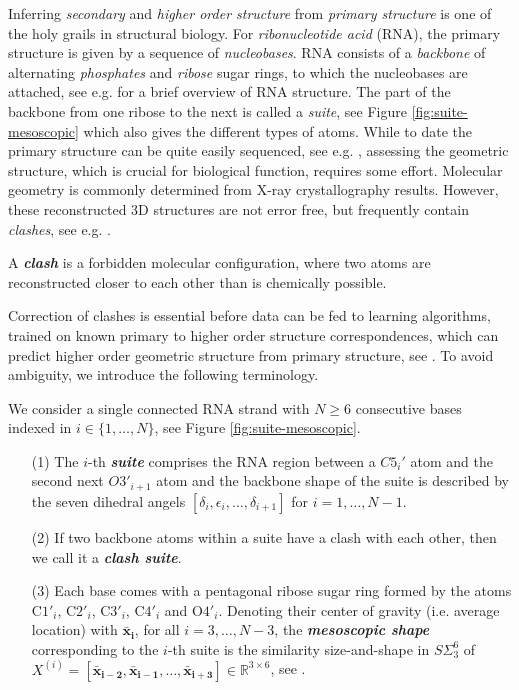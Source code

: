 \documentclass{llncs}
\begin{document}
Inferring \emph{secondary} and \emph{higher order structure} from \emph{primary structure} is one of the holy grails in structural biology.
For \emph{ribonucleotide acid} (RNA), the primary structure is given by a sequence of \emph{nucleobases}. 
RNA 
consists of a \emph{backbone} of alternating \emph{phosphates} and \emph{ribose} sugar rings, to which the nucleobases are attached, see e.g. \cite{eltzner2018} for a brief overview of RNA structure. The part of the backbone from one ribose to the next is called a \emph{suite}, see Figure \ref{fig:suite-mesoscopic} which also gives the different types of atoms.
While to date the primary structure can be quite easily sequenced, see e.g. \cite{Stark2019}, assessing the geometric structure, which is crucial for biological function, requires some effort. Molecular geometry is commonly determined from X-ray crystallography results. However, these reconstructed 3D structures are not error free, but frequently contain \emph{clashes}, see e.g. \cite{Murray13904}.

\begin{definition} %
A \textbf{\emph{clash}} is a forbidden molecular configuration, where two atoms are reconstructed closer to each other than is chemically possible.
\end{definition}
Correction of clashes is essential before data can be fed to learning algorithms, trained on known primary to higher order structure correspondences, which can predict higher order geometric structure from primary structure, see \cite{JAIN2015181}. To avoid ambiguity, we introduce the following terminology.

\begin{definition} %
We consider a single connected RNA strand with $N\geq 6$ consecutive bases indexed in $i \in \{1,\ldots, N\}$, see Figure \ref{fig:suite-mesoscopic}. %
\begin{itemize}
  \item[\textnormal{(1)}] The $i$-th \textbf{\emph{suite}} comprises the RNA region between a $C5_i'$ atom and the second next $O3'_{i+1}$ atom and the backbone shape of the suite is described by the seven dihedral angels $[\delta_{i},\epsilon_i,\dots,\delta_{i+1}]$ for $i = 1,\dots,N-1$.
  \item[\textnormal{(2)}] If two backbone atoms within a suite have a clash with each other, then we call it a \textbf{\emph{clash suite}}.
  \item[\textnormal{(3)}] Each base comes with a pentagonal ribose sugar ring formed by the atoms $\text{C}1'_i$, $\text{C}2'_i$, $\text{C}3'_i$, $\text{C}4'_i$ and  $\text{O}4'_i$. Denoting their center of gravity (i.e. average location) with  $\mathbf{\bar{x}_i}$, for all $i=3,\dots,N-3$, the \textbf{\emph{mesoscopic shape}} corresponding to the $i$-th suite is the similarity size-and-shape in $S\Sigma_3^{6}$ of $X^{(i)}=[\mathbf{\bar{x}_{i-2}}, \mathbf{\bar{x}_{i-1}}, \dots, \mathbf{\bar{x}_{i+3}}]\in \mathbb{R}^{3\times 6}$, see \cite{Drydmard16}.
\end{itemize}
\end{definition}
\end{document}
